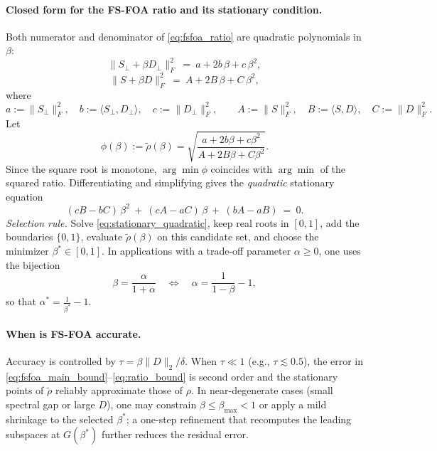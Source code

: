 \paragraph{Closed form for the FS-FOA ratio and its stationary condition.}
Both numerator and denominator of \eqref{eq:fsfoa_ratio} are quadratic polynomials in $\beta$:
\begin{equation}\label{eq:num_quad}
\|S_\perp+\beta D_\perp\|_F^2\ =\ a+2b\,\beta+c\,\beta^2,
\end{equation}
\begin{equation}\label{eq:den_quad}
\|S+\beta D\|_F^2\ =\ A+2B\,\beta+C\,\beta^2,
\end{equation}
where
\begin{equation}\label{eq:abc_defs}
a:=\|S_\perp\|_F^2,\quad b:=\langle S_\perp,D_\perp\rangle,\quad c:=\|D_\perp\|_F^2,\qquad
A:=\|S\|_F^2,\quad B:=\langle S,D\rangle,\quad C:=\|D\|_F^2.
\end{equation}
Let
\begin{equation}\label{eq:phi_def}
\phi(\beta):=\widetilde\rho(\beta)=\sqrt{\frac{a+2b\beta+c\beta^2}{A+2B\beta+C\beta^2}}.
\end{equation}
Since the square root is monotone, $\arg\min\phi$ coincides with $\arg\min$ of the squared ratio. Differentiating and simplifying gives the \emph{quadratic} stationary equation
\begin{equation}\label{eq:stationary_quadratic}
(cB-bC)\,\beta^2\ +\ (cA-aC)\,\beta\ +\ (bA-aB)\ =\ 0.
\end{equation}
\emph{Selection rule.} Solve \eqref{eq:stationary_quadratic}, keep real roots in $[0,1]$, add the boundaries $\{0,1\}$, evaluate $\widetilde\rho(\beta)$ on this candidate set, and choose the minimizer $\beta^*\in[0,1]$. In applications with a trade-off parameter $\alpha\ge 0$, one uses the bijection
\begin{equation}\label{eq:alpha_beta}
\beta=\frac{\alpha}{1+\alpha}\quad\Longleftrightarrow\quad \alpha=\frac{1}{1-\beta}-1,
\end{equation}
so that $\alpha^*=\frac{1}{\beta^*}-1$.

\paragraph{When is FS-FOA accurate.}
Accuracy is controlled by $\tau=\beta\|D\|_2/\delta$. When $\tau\ll 1$ (e.g., $\tau\lesssim 0.5$), the error in \eqref{eq:fsfoa_main_bound}--\eqref{eq:ratio_bound} is second order and the stationary points of $\widetilde\rho$ reliably approximate those of $\rho$. In near-degenerate cases (small spectral gap or large $D$), one may constrain $\beta\le\beta_{\max}<1$ or apply a mild shrinkage to the selected $\beta^*$; a one-step refinement that recomputes the leading subspaces at $G(\beta^*)$ further reduces the residual error.

